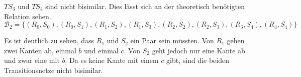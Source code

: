 \documentclass[10pt,a4paper,oneside,ngerman,numbers=noenddot]{scrartcl}
\begin{document}
	\(TS_{3}\) und \(TS_{4}\) sind nicht bisimilar. Dies lässt sich an der theoretisch benötigten Relation sehen.
	\[
		\mathcal{B}_{2} = \{(R_{0}, S_{0}), (R_{0}, S_{1}), (R_{1}, S_{2}), (R_{1}, S_{3}), (R_{2}, S_{2}), (R_{2}, S_{3}), (R_{3}, S_{4}), (R_{4}, S_{4})\}
	\]
	
	Es ist deutlich zu sehen, dass \(R_{1}\) und \(S_{2}\) ein Paar sein müssten. Von \(R_{1}\) gehen zwei Kanten ab, einmal \(b\) und einmal \(c\). Von \(S_{2}\) geht jedoch nur eine Kante ab und zwar eine mit \(b\). Da es keine Kante mit einem \(c\) gibt, sind die beiden Transitionsnetze nicht bisimilar.
\end{document}
